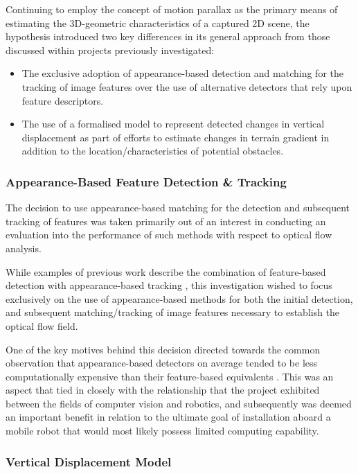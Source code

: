 Continuing to employ the concept of motion parallax as the primary means of estimating the 3D-geometric characteristics of a captured 2D scene, the hypothesis introduced two key differences in its general approach from those discussed within projects previously investigated:

\begin{itemize}
	\item The exclusive adoption of appearance-based detection and matching for the tracking of image features over the use of alternative detectors that rely upon feature descriptors.
	\item The use of a formalised model to represent detected changes in vertical displacement as part of efforts to estimate changes in terrain gradient in addition to the location/characteristics of potential obstacles. 
\end{itemize}

\subsubsection{Appearance-Based Feature Detection \& Tracking}
\label{hypo-tracking}

The decision to use appearance-based matching for the detection and subsequent tracking of features was taken primarily out of an interest in conducting an evaluation into the performance of such methods with respect to optical flow analysis. 

While examples of previous work describe the combination of feature-based detection with appearance-based tracking \cite{low}, this investigation wished to focus exclusively on the use of appearance-based methods for both the initial detection, and subsequent matching/tracking of image features necessary to establish the optical flow field.

One of the key motives behind this decision directed towards the common observation that appearance-based detectors on average tended to be less computationally expensive than their feature-based equivalents \cite{}. This was an aspect that tied in closely with the relationship that the project exhibited between the fields of computer vision and robotics, and subsequently was deemed an important benefit in relation to the ultimate goal of installation aboard a mobile robot that would most likely possess limited computing capability.

\subsubsection{Vertical Displacement Model}
\label{hypo-model}

